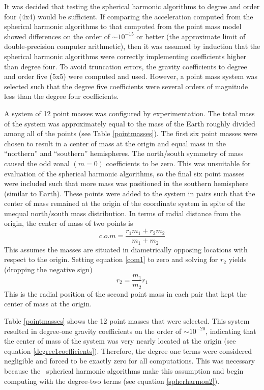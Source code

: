 \begin{description}
It was decided that testing the spherical harmonic algorithms to degree and
order four (4x4) would be sufficient. If comparing the acceleration computed
from the spherical harmonic algorithms to that computed from the point mass
model showed differences on the order of $\sim 10^{-15}$ or better (the
approximate limit of double-precision computer arithmetic), then it was assumed
by induction that the spherical harmonic algorithms were correctly implementing 
coefficients higher than degree four.  To avoid truncation errors, the gravity
coefficients to degree and order five (5x5) were computed and used. However, a
point mass system was selected such that the degree five coefficients were
several orders of magnitude less than the degree four coefficients.

A system of 12 point masses was configured by experimentation. The total
mass of the system was approximately equal to the mass of the Earth roughly
divided among all of the points (see Table \ref{pointmasses}).  The first six
point masses were chosen to result in a center of mass at the origin and equal
mass in the ``northern'' and ``southern'' hemispheres. The north/south symmetry
of mass caused the odd zonal $(m=0)$ coefficients to be zero. This was
unsuitable for evaluation of the spherical harmonic algorithms, so the final six
point masses were included such that more mass was positioned in the southern
hemisphere (similar to Earth). These points were added to the system in pairs
such that the center of mass remained at the origin of the coordinate system in
spite of the unequal north/south mass distribution. In terms of radial distance
from the origin, the center of mass of two points is
\begin{equation}\label{com1}
c.o.m=\frac{r_1m_1+r_2m_2}{m_1+m_2}
\end{equation}
This assumes the masses are situated in diametrically opposing locations with
respect to the origin. Setting equation \ref{com1} to zero and solving for $r_2$
yields (dropping the negative sign)
\begin{equation}\label{com2}
r_2=\frac{m_1}{m_2}r_1
\end{equation}
This is the radial position of the second point mass in each pair that kept the
center of mass at the origin.

Table \ref{pointmasses} shows the 12 point masses that were selected.  This
system resulted in degree-one gravity coefficients on the order of
$\sim 10^{-20}$, indicating that the center of mass of the system was very
nearly located at the origin (see equation \ref{degree1coefficients}).
Therefore, the degree-one terms were considered negligible and forced to be
exactly zero for all computations. This was necessary because the \ModelDesc\
spherical harmonic algorithms make this assumption and begin computing with the
degree-two terms (see equation \ref{spherharmon2}).


\end{description}
